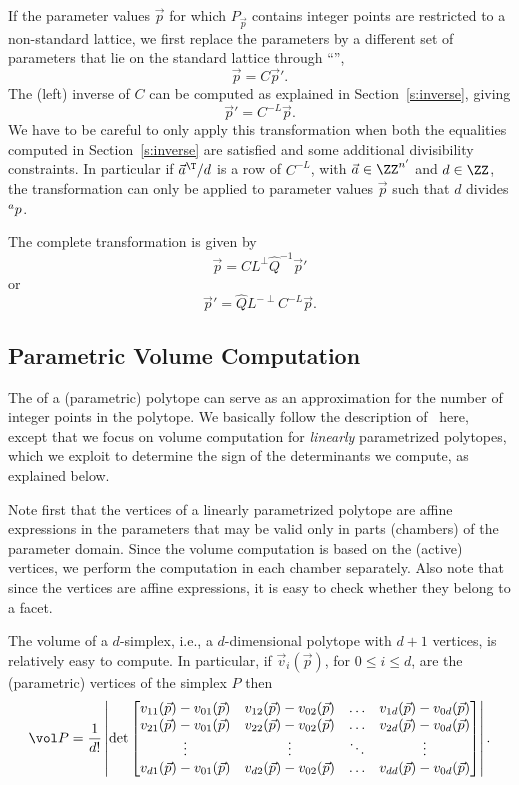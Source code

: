 If the parameter values $\vec p$ for which $P_{\vec p}$ contains integer points
are restricted to a non-standard lattice, we first replace the parameters
by a different set of parameters that lie on the standard lattice
through ``'',
$$
\vec p = C \vec p'
.
$$
The (left) inverse of $C$ can be computed as explained in
Section~\ref{s:inverse}, giving
$$
\vec p' = C^{-L} \vec p
.
$$
We have to be careful to only apply this transformation when
both the equalities computed in Section~\ref{s:inverse} are satisfied
and some additional divisibility constraints.
In particular if $\vec a^\T/d$ is a row of $C^{-L}$, with $\vec a \in \ZZ^{n'}$
and $d \in \ZZ$, the transformation can only be applied to parameter values
$\vec p$ such that $d$ divides $\sp a p$.

The complete transformation is given by
$$
\vec p = C L^\perp \hat Q^{-1} \vec p'
$$
or
$$
\vec p' = \hat Q L^{-\perp} C^{-L} \vec p
.
$$

\subsection{Parametric Volume Computation}

The  of a (parametric) polytope can serve as an approximation
for the number of integer points in the polytope.
We basically follow the description of~ here, except that we
focus on volume computation for {\em linearly}
parametrized polytopes, which we exploit to determine the sign
of the determinants we compute, as explained below.

Note first that
the vertices of a linearly parametrized polytope are affine expressions
in the parameters that may be valid only in parts (chambers)
of the parameter domain.
Since the volume computation is based on the (active) vertices, we perform
the computation in each chamber separately.
Also note that since the vertices are affine expressions, it is
easy to check whether they belong to a facet.

The volume of a $d$-simplex, i.e., a $d$-dimensional polytope with
$d+1$ vertices, is relatively easy to compute.
In particular, if $\vec v_i(\vec p)$, for $0 \le i \le d$,
are the (parametric) vertices
of the simplex $P$ then
\begin{equation}
\label{eq:volume}
\vol P = 
\frac 1 {d!}
\left|
\det
\begin{bmatrix}
v_{11}(\vec p) - v_{01}(\vec p) &
v_{12}(\vec p) - v_{02}(\vec p) &
\ldots &
v_{1d}(\vec p) - v_{0d}(\vec p)
\\
v_{21}(\vec p) - v_{01}(\vec p) &
v_{22}(\vec p) - v_{02}(\vec p) &
\ldots &
v_{2d}(\vec p) - v_{0d}(\vec p)
\\
\vdots & \vdots & \ddots & \vdots
\\
v_{d1}(\vec p) - v_{01}(\vec p) &
v_{d2}(\vec p) - v_{02}(\vec p) &
\ldots &
v_{dd}(\vec p) - v_{0d}(\vec p)
\end{bmatrix}
\right|.
\end{equation}

